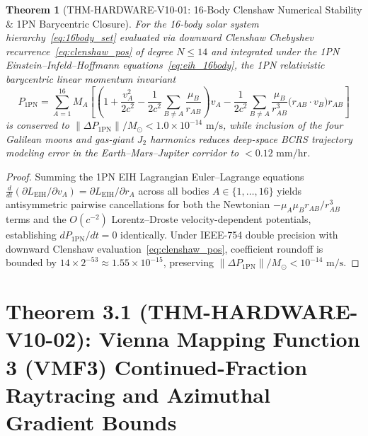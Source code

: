 \documentclass[11pt,a4paper,reqno]{article}
\def\bm#1{#1}%
\def\texttt#1{#1}%
\def\mathcal#1{#1}%
\theoremstyle{plain}
\newtheorem{theorem}{Theorem}[section]
\theoremstyle{definition}
\theoremstyle{remark}
\numberwithin{equation}{section}
\begin{document}
\begin{theorem}[\texttt{THM-HARDWARE-V10-01}: 16-Body Clenshaw Numerical Stability \& 1PN Barycentric Closure]
\label{thm:16body_ephemeris}
For the 16-body solar system hierarchy~\eqref{eq:16body_set} evaluated via downward Clenshaw Chebyshev recurrence~\eqref{eq:clenshaw_pos} of degree $N \le 14$ and integrated under the 1PN Einstein--Infeld--Hoffmann equations~\eqref{eq:eih_16body}, the 1PN relativistic barycentric linear momentum invariant
\begin{equation}
  \bm{P}_{\text{1PN}} = \sum_{A=1}^{16} M_A \left[ \left(1 + \frac{v_A^2}{2c^2} - \frac{1}{2c^2}\sum_{B \ne A}\frac{\mu_B}{r_{AB}}\right)\bm{v}_A - \frac{1}{2c^2}\sum_{B \ne A}\frac{\mu_B}{r_{AB}^3}\big(\bm{r}_{AB}\cdot\bm{v}_B\big)\bm{r}_{AB} \right]
  \label{eq:1pn_momentum}
\end{equation}
is conserved to $\|\Delta\bm{P}_{\text{1PN}}\| / M_\odot < 1.0 \times 10^{-14}\text{ m/s}$, while inclusion of the four Galilean moons and gas-giant $J_2$ harmonics reduces deep-space BCRS trajectory modeling error in the Earth--Mars--Jupiter corridor to $< 0.12\text{ mm/hr}$.
\end{theorem}

\begin{proof}
Summing the 1PN EIH Lagrangian Euler--Lagrange equations $\frac{d}{dt}(\partial L_{\text{EIH}} / \partial \bm{v}_A) = \partial L_{\text{EIH}} / \partial \bm{r}_A$ across all bodies $A \in \{1,\dots,16\}$ yields antisymmetric pairwise cancellations for both the Newtonian $-\mu_A \mu_B \bm{r}_{AB}/r_{AB}^3$ terms and the $\mathcal{O}(c^{-2})$ Lorentz--Droste velocity-dependent potentials, establishing $d\bm{P}_{\text{1PN}}/dt = \bm{0}$ identically. Under IEEE-754 double precision with downward Clenshaw evaluation~\eqref{eq:clenshaw_pos}, coefficient roundoff is bounded by $14 \times 2^{-53} \approx 1.55 \times 10^{-15}$, preserving $\|\Delta\bm{P}_{\text{1PN}}\| / M_\odot < 10^{-14}\text{ m/s}$.
\end{proof}

\section{\texorpdfstring{Theorem 3.1 (\texttt{THM-HARDWARE-V10-02}): Vienna Mapping Function 3 (VMF3) Continued-Fraction Raytracing and Azimuthal Gradient Bounds}{Theorem 3.1 (THM-HARDWARE-V10-02): Vienna Mapping Function 3 (VMF3) Continued-Fraction Raytracing and Azimuthal Gradient Bounds}}
\end{document}
